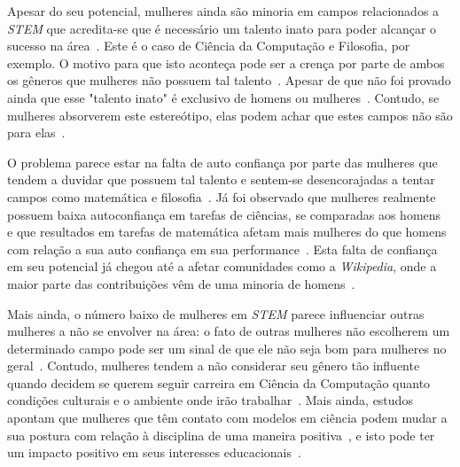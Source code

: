 Apesar do seu potencial, mulheres ainda são minoria em campos relacionados a \emph{STEM} que acredita-se que é necessário um talento inato para poder alcançar o sucesso na área~\cite{leslie2015expectations}. Este é o caso de Ciência da Computação e Filosofia, por exemplo. O motivo para que isto aconteça pode ser a crença por parte de ambos os gêneros que mulheres não possuem tal talento~\cite{tiedemann2000gender,kirkcaldy2007parental}. Apesar de que não foi provado ainda que esse "talento inato" é exclusivo de homens ou mulheres~\cite{hyde2005gender}. Contudo, se mulheres absorverem este estereótipo, elas podem achar que estes campos não são para elas~\cite{wigfield2000expectancy,shapiro2011major}.

O problema parece estar na falta de auto confiança por parte das mulheres que tendem a duvidar que possuem tal talento e sentem-se desencorajadas a tentar campos como matemática e filosofia~\cite{leslie2015expectations}. Já foi observado que mulheres realmente possuem baixa autoconfiança em tarefas de ciências, se comparadas aos homens~\cite{fox1992confidence} e que resultados em tarefas de matemática afetam mais mulheres do que homens com relação a sua auto confiança em sua performance~\cite{campbell1986effects}. Esta falta de confiança em seu potencial já chegou até a afetar comunidades como a \emph{Wikipedia}, onde a maior parte das contribuições vêm de uma minoria de homens~\cite{antin2011gender,lam2011wp}.

Mais ainda, o número baixo de mulheres em \emph{STEM} parece influenciar outras mulheres a não se envolver na área: o fato de outras mulheres não escolherem um determinado campo pode ser um sinal de que ele não seja bom para mulheres no geral~\cite{shapiro2011major}. Contudo, mulheres tendem a não considerar seu gênero tão influente quando decidem se querem seguir carreira em Ciência da Computação quanto condições culturais e o ambiente onde irão trabalhar~\cite{blum2007cultural}. Mais ainda, estudos apontam que mulheres que têm contato com modelos em ciência podem mudar a sua postura com relação à disciplina de uma maneira positiva~\cite{smith1986effect}, e isto pode ter um impacto positivo em seus interesses educacionais~\cite{nixon1999educational}.



